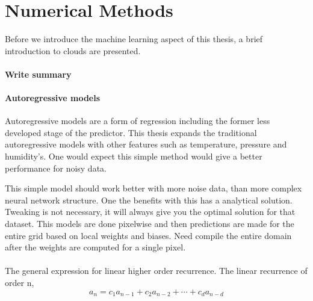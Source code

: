 \setcounter{chapter}{2}
\chapter{Numerical Methods} \label{ch:num_methods}
Before we introduce the machine learning aspect of this thesis, a brief introduction to clouds are presented. 
\\ \\
\textbf{Write summary}

\subsubsection{Autoregressive models}
Autoregressive models are a form of regression including the former less developed stage of the predictor. This thesis expands the traditional autoregressive models with other features such as temperature, pressure and humidity's. One would expect this simple method would give a better performance for noisy data.

This simple model should work better with more noise data, than more complex neural network structure. One the benefits with this has a analytical solution. Tweaking is not necessary, it will always give you the optimal solution for that dataset. This models are done pixelwise and then predictions are made for the entire grid based on local weights and biases. Need compile the entire domain after the weights are computed for a single pixel.
\\ \\
The general expression for linear higher order recurrence. The linear recurrence of order n,
\begin{equation} \label{eq:reccurence_relation}
    a_{n}=c_{1}a_{n-1}+c_{2}a_{n-2}+\cdots +c_{d}a_{n-d}
\end{equation}


